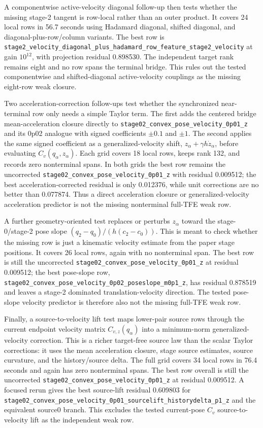 \documentclass[11pt]{article}
\newcommand{\tfe}{TFE}
\begin{document}
A componentwise active-velocity diagonal follow-up then tests whether the
missing stage-2 tangent is row-local rather than an outer product.  It covers
24 local rows in 56.7 seconds using Hadamard diagonal, shifted diagonal, and
diagonal-plus-row/column variants.  The best row is
\nolinkurl{stage2_velocity_diagonal_plus_hadamard_row_feature_stage2_velocity}
at gain $10^{12}$, with projection residual 0.898530.  The independent target
rank remains eight and no row spans the terminal bridge.  This rules out the
tested componentwise and shifted-diagonal active-velocity couplings as the
missing eight-row weak closure.

Two acceleration-correction follow-ups test whether the synchronized
near-terminal row only needs a simple Taylor term.  The first adds the centered
bridge mean-acceleration closure directly to
\nolinkurl{stage02_convex_pose_velocity_0p01_z} and its 0p02 analogue with
signed coefficients $\pm0.1$ and $\pm1$.  The second applies the same signed
coefficient as a generalized-velocity shift,
$z_\alpha+\gamma h\dot z_\alpha$, before evaluating $C_v(q_\alpha,z_\alpha)$.
Each grid covers 18 local rows, keeps rank 132, and records zero nonterminal
spans.  In both grids the best row remains the uncorrected
\nolinkurl{stage02_convex_pose_velocity_0p01_z} with residual 0.009512; the
best acceleration-corrected residual is only 0.012376, while unit corrections
are no better than 0.077874.  Thus a direct acceleration closure or
generalized-velocity acceleration predictor is not the missing nonterminal
full-\tfe{} weak row.

A further geometry-oriented test replaces or perturbs $z_\alpha$ toward the
stage-0/stage-2 pose slope $(q_2-q_0)/(h(c_2-c_0))$.  This is meant to check
whether the missing row is just a kinematic velocity estimate from the paper
stage positions.  It covers 26 local rows, again with no nonterminal span.  The
best row is still the uncorrected
\nolinkurl{stage02_convex_pose_velocity_0p01_z} at residual 0.009512; the best
pose-slope row,
\nolinkurl{stage02_convex_pose_velocity_0p02_poseslope_m0p1_z}, has residual
0.878519 and leaves a stage-2 dominated translation-velocity direction.  The
tested pose-slope velocity predictor is therefore also not the missing
full-\tfe{} weak row.

Finally, a source-to-velocity lift test maps lower-pair source rows through
the current endpoint velocity matrix $C_{v,z}(q_\alpha)$ into a minimum-norm
generalized-velocity correction.  This is a richer target-free source law than
the scalar Taylor corrections: it uses the mean acceleration closure, stage
source estimates, source curvature, and the history/source delta.  The full
grid covers 34 local rows in 76.4 seconds and again has zero nonterminal spans.
The best row overall is still the uncorrected
\nolinkurl{stage02_convex_pose_velocity_0p01_z} at residual 0.009512.  A
focused rerun gives the best source-lift residual 0.609803 for
\nolinkurl{stage02_convex_pose_velocity_0p01_sourcelift_historydelta_p1_z}
and the equivalent source0 branch.  This excludes the tested current-pose
$C_v$ source-to-velocity lift as the independent weak row.
\end{document}
